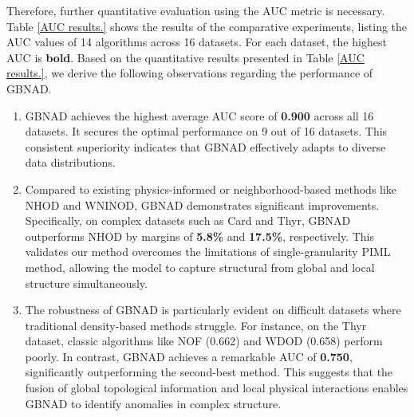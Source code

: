 \documentclass[times, review, 10pt]{elsarticle}
\begin{document}
Therefore, further quantitative evaluation using the AUC metric is necessary.
Table \ref{AUC results.} shows the results of the comparative experiments, listing the AUC values of 14 algorithms across 16 datasets. For each dataset, the highest AUC is \textbf{bold}. 
Based on the quantitative results presented in Table \ref{AUC results.}, we derive the following observations regarding the performance of GBNAD.
\begin{enumerate}[\indent(1)]
\item {GBNAD achieves the highest average AUC score of \textbf{0.900} across all 16 datasets. It secures the optimal performance on 9 out of 16 datasets. This consistent superiority indicates that GBNAD effectively adapts to diverse data distributions.}
\item Compared to existing physics-informed or neighborhood-based methods like NHOD and WNINOD, GBNAD demonstrates significant improvements. Specifically, on complex datasets such as {Card} and {Thyr}, GBNAD outperforms NHOD by margins of \textbf{5.8\%} and \textbf{17.5\%}, respectively. This validates our method overcomes the limitations of single-granularity PIML method, allowing the model to capture structural from global and local structure simultaneously.
\item The robustness of GBNAD is particularly evident on difficult datasets where traditional density-based methods struggle. For instance, on the {Thyr} dataset, classic algorithms like NOF (0.662) and WDOD (0.658) perform poorly. In contrast, GBNAD achieves a remarkable AUC of \textbf{0.750}, significantly outperforming the second-best method. This suggests that the fusion of global topological information and local physical interactions enables GBNAD to identify anomalies in complex structure.
\end{enumerate}
\end{document}
